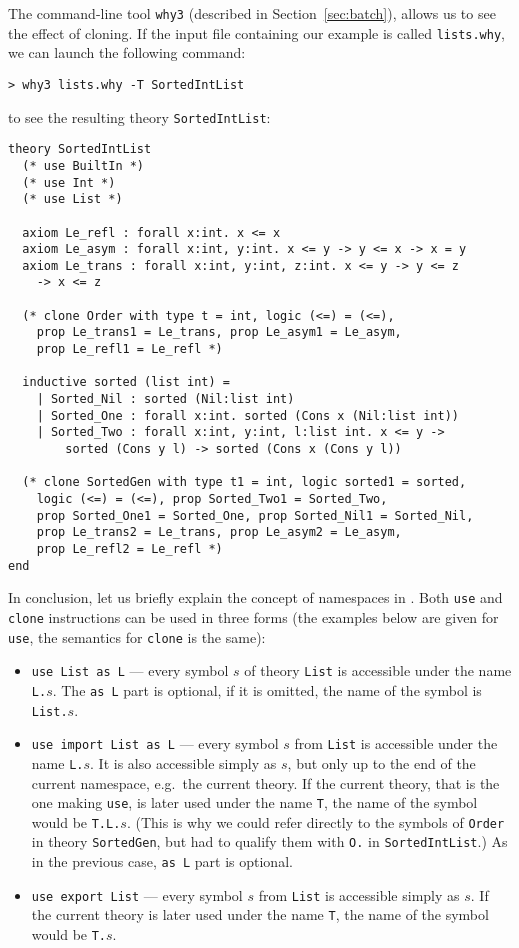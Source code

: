 The command-line tool \texttt{why3} (described in
Section~\ref{sec:batch}), allows us to see the effect of cloning.
If the input file containing our example is called \texttt{lists.why},
we can launch the following command:
\begin{verbatim}
> why3 lists.why -T SortedIntList
\end{verbatim}
to see the resulting theory \texttt{SortedIntList}:
\begin{verbatim}
theory SortedIntList
  (* use BuiltIn *)
  (* use Int *)
  (* use List *)

  axiom Le_refl : forall x:int. x <= x
  axiom Le_asym : forall x:int, y:int. x <= y -> y <= x -> x = y
  axiom Le_trans : forall x:int, y:int, z:int. x <= y -> y <= z
    -> x <= z

  (* clone Order with type t = int, logic (<=) = (<=),
    prop Le_trans1 = Le_trans, prop Le_asym1 = Le_asym,
    prop Le_refl1 = Le_refl *)

  inductive sorted (list int) =
    | Sorted_Nil : sorted (Nil:list int)
    | Sorted_One : forall x:int. sorted (Cons x (Nil:list int))
    | Sorted_Two : forall x:int, y:int, l:list int. x <= y ->
        sorted (Cons y l) -> sorted (Cons x (Cons y l))

  (* clone SortedGen with type t1 = int, logic sorted1 = sorted,
    logic (<=) = (<=), prop Sorted_Two1 = Sorted_Two,
    prop Sorted_One1 = Sorted_One, prop Sorted_Nil1 = Sorted_Nil,
    prop Le_trans2 = Le_trans, prop Le_asym2 = Le_asym,
    prop Le_refl2 = Le_refl *)
end
\end{verbatim}

In conclusion, let us briefly explain the concept of namespaces
in \why. Both \texttt{use} and \texttt{clone} instructions can
be used in three forms (the examples below are given for \texttt{use},
the semantics for \texttt{clone} is the same):
\begin{itemize}
\item \texttt{use List as L} --- every symbol $s$ of theory \texttt{List}
is accessible under the name \texttt{L.$s$}. The \texttt{as L} part is
optional, if it is omitted, the name of the symbol is \texttt{List.$s$}.

\item \texttt{use import List as L} --- every symbol $s$ from
\texttt{List} is accessible under the name \texttt{L.$s$}. It is also
accessible simply as \texttt{$s$}, but only up to the end of the current
namespace, e.g.~the current theory. If the current theory, that is the
one making \texttt{use}, is later used under the name \texttt{T},
the name of the symbol would be \texttt{T.L.$s$}. (This is why we
could refer directly to the symbols of \texttt{Order} in theory
\texttt{SortedGen}, but had to qualify them with \texttt{O.}
in \texttt{SortedIntList}.)
As in the previous case, \texttt{as L} part is optional.

\item \texttt{use export List} --- every symbol $s$ from \texttt{List}
is accessible simply as \texttt{$s$}. If the current theory
is later used under the name \texttt{T}, the name of the symbol
would be \texttt{T.$s$}.
\end{itemize}

